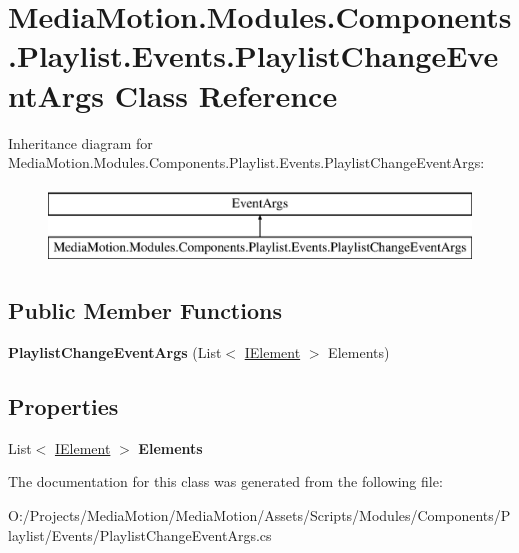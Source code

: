 \hypertarget{class_media_motion_1_1_modules_1_1_components_1_1_playlist_1_1_events_1_1_playlist_change_event_args}{\section{Media\+Motion.\+Modules.\+Components.\+Playlist.\+Events.\+Playlist\+Change\+Event\+Args Class Reference}
\label{class_media_motion_1_1_modules_1_1_components_1_1_playlist_1_1_events_1_1_playlist_change_event_args}
}
Inheritance diagram for Media\+Motion.\+Modules.\+Components.\+Playlist.\+Events.\+Playlist\+Change\+Event\+Args\+:\begin{figure}[H]
\begin{center}
\leavevmode
\includegraphics[height=2.000000cm]{class_media_motion_1_1_modules_1_1_components_1_1_playlist_1_1_events_1_1_playlist_change_event_args}
\end{center}
\end{figure}
\subsection*{Public Member Functions}
\begin{DoxyCompactItemize}
\item 
\hypertarget{class_media_motion_1_1_modules_1_1_components_1_1_playlist_1_1_events_1_1_playlist_change_event_args_a08d2f9853f428dd6df0a200c79b97a5d}{{\bfseries Playlist\+Change\+Event\+Args} (List$<$ \hyperlink{interface_media_motion_1_1_core_1_1_models_1_1_interfaces_1_1_i_element}{I\+Element} $>$ Elements)}\label{class_media_motion_1_1_modules_1_1_components_1_1_playlist_1_1_events_1_1_playlist_change_event_args_a08d2f9853f428dd6df0a200c79b97a5d}

\end{DoxyCompactItemize}
\subsection*{Properties}
\begin{DoxyCompactItemize}
\item 
\hypertarget{class_media_motion_1_1_modules_1_1_components_1_1_playlist_1_1_events_1_1_playlist_change_event_args_a8367ec884414f33038540efe88a8df98}{List$<$ \hyperlink{interface_media_motion_1_1_core_1_1_models_1_1_interfaces_1_1_i_element}{I\+Element} $>$ {\bfseries Elements}}\label{class_media_motion_1_1_modules_1_1_components_1_1_playlist_1_1_events_1_1_playlist_change_event_args_a8367ec884414f33038540efe88a8df98}

\end{DoxyCompactItemize}


The documentation for this class was generated from the following file\+:\begin{DoxyCompactItemize}
\item 
O\+:/\+Projects/\+Media\+Motion/\+Media\+Motion/\+Assets/\+Scripts/\+Modules/\+Components/\+Playlist/\+Events/Playlist\+Change\+Event\+Args.\+cs\end{DoxyCompactItemize}
